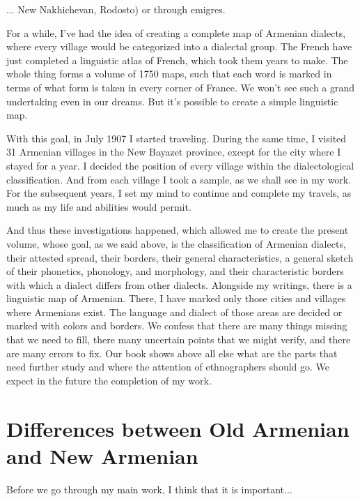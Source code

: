 \begin{adjarianpage}\label{page:14}\end{adjarianpage}%

... New Nakhichevan, Rodosto) or through emigres. 

For a while, I've had the idea of creating a complete map of Armenian dialects, where every village would be categorized into a dialectal group. The French have just completed a linguistic atlas of French, which took them years to make. The whole thing forms a volume of 1750 maps, such that each word is marked in terms of what form is taken in every corner of France. We won't see such a grand undertaking even in our dreams. But it's possible to create a simple linguistic map.

With this goal, in July 1907 I started traveling. During the same time, I visited 31 Armenian villages in the New Bayazet province, except for the city where I stayed for a year. I decided the position of every village within the dialectological classification. And from each village I took a sample, as we shall see in my work. For the subsequent years, I set my mind to continue and complete my travels, as much as my life and abilities would permit. 

And thus these investigations happened, which allowed me to create the present volume, whose goal, as we said above, is the classification of Armenian dialects, their attested spread, their borders, their general characteristics, a general sketch of their phonetics, phonology, and morphology, and their characteristic borders with which a dialect differs from other dialects. Alongside my writings, there is a linguistic map of Armenian. There, I have marked only those cities and villages where Armenians exist. The language and dialect of those areas are decided or marked with colors and borders. We confess that there are many things missing that we need to fill, there many uncertain points that we might verify, and there are many errors to fix. Our book shows above all else what are the parts that need further study and where the attention of ethnographers should go. We expect in the future the completion of my work. 


\section{Differences between Old Armenian and New Armenian}

Before we go through my main work, I think that it is important... 



